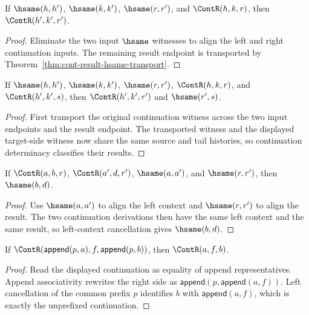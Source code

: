 \begin{theorem}
\label{thm:cont-hsame-transport}
If $\hsame(h,h')$, $\hsame(k,k')$, $\hsame(r,r')$, and $\ContR(h,k,r)$, then
$\ContR(h',k',r')$.
\end{theorem}
\begin{proof}
Eliminate the two input $\hsame$ witnesses to align the left and right
continuation inputs. The remaining result endpoint is transported by
Theorem~\ref{thm:cont-result-hsame-transport}.
\end{proof}

\begin{theorem}
\label{thm:cont-transport-result-classified}
If $\hsame(h,h')$, $\hsame(k,k')$, $\hsame(r,r')$,
$\ContR(h,k,r)$, and $\ContR(h',k',s)$, then
$\ContR(h',k',r')$ and $\hsame(r',s)$.
\end{theorem}
\begin{proof}
First transport the original continuation witness across the two input
endpoints and the result endpoint. The transported witness and the displayed
target-side witness now share the same source and tail histories, so
continuation determinacy classifies their results.
\end{proof}

\begin{theorem}
\label{thm:cont-cancel-hsame-left-context}
If $\ContR(a,b,r)$, $\ContR(a',d,r')$, $\hsame(a,a')$, and $\hsame(r,r')$,
then $\hsame(b,d)$.
\end{theorem}
\begin{proof}
Use $\hsame(a,a')$ to align the left context and $\hsame(r,r')$ to align the
result. The two continuation derivations then have the same left context and
the same result, so left-context cancellation gives $\hsame(b,d)$.
\end{proof}

\begin{theorem}
\label{thm:continuation-prefix-cancel}
If $\ContR(\mathsf{append}(p,a),f,\mathsf{append}(p,b))$, then
$\ContR(a,f,b)$.
\end{theorem}
\begin{proof}
Read the displayed continuation as equality of append representatives. Append
associativity rewrites the right side as $\mathsf{append}(p,\mathsf{append}(a,f))$.
Left cancellation of the common prefix $p$ identifies $b$ with
$\mathsf{append}(a,f)$, which is exactly the unprefixed continuation.
\end{proof}

